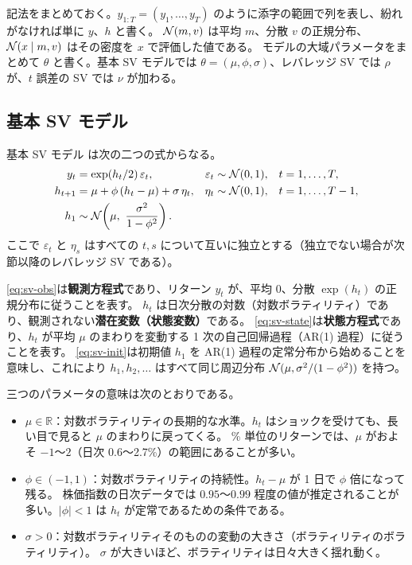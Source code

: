 記法をまとめておく。$y_{1:T} = (y_1, \dots, y_T)$ のように添字の範囲で列を表し、紛れがなければ単に $y$、$h$ と書く。
$\mathcal{N}(m, v)$ は平均 $m$、分散 $v$ の正規分布、$\mathcal{N}(x \mid m, v)$ はその密度を $x$ で評価した値である。
モデルの大域パラメータをまとめて $\theta$ と書く。基本 SV モデルでは $\theta = (\mu, \phi, \sigma)$、レバレッジ SV では $\rho$ が、$t$ 誤差の SV では $\nu$ が加わる。

\subsection{基本 SV モデル}\label{sec:model-basic}

基本 SV モデル \parencite{taylor1986,jacquier1994,kim1998} は次の二つの式からなる。
\begin{align}
  y_t &= \exp(h_t/2)\,\varepsilon_t, & \varepsilon_t &\sim \mathcal{N}(0, 1), & t &= 1, \dots, T, \label{eq:sv-obs}\\
  h_{t+1} &= \mu + \phi\,(h_t - \mu) + \sigma\,\eta_t, & \eta_t &\sim \mathcal{N}(0, 1), & t &= 1, \dots, T-1, \label{eq:sv-state}\\
  h_1 &\sim \mathcal{N}\!\left(\mu,\ \frac{\sigma^2}{1-\phi^2}\right). \label{eq:sv-init}
\end{align}
ここで $\varepsilon_t$ と $\eta_s$ はすべての $t, s$ について互いに独立とする（独立でない場合が次節以降のレバレッジ SV である）。

\cref{eq:sv-obs}は\textbf{観測方程式}であり、リターン $y_t$ が、平均 0、分散 $\exp(h_t)$ の正規分布に従うことを表す。
$h_t$ は日次分散の対数（対数ボラティリティ）であり、観測されない\textbf{潜在変数（状態変数）}である。
\cref{eq:sv-state}は\textbf{状態方程式}であり、$h_t$ が平均 $\mu$ のまわりを変動する 1 次の自己回帰過程（AR(1) 過程）に従うことを表す。
\cref{eq:sv-init}は初期値 $h_1$ を AR(1) 過程の定常分布から始めることを意味し、これにより $h_1, h_2, \dots$ はすべて同じ周辺分布 $\mathcal{N}(\mu, \sigma^2/(1-\phi^2))$ を持つ。

三つのパラメータの意味は次のとおりである。
\begin{itemize}
  \item $\mu \in \mathbb{R}$：対数ボラティリティの長期的な水準。$h_t$ はショックを受けても、長い目で見ると $\mu$ のまわりに戻ってくる。
    \% 単位のリターンでは、$\mu$ がおよそ $-1$〜$2$（日次 0.6〜2.7\%）の範囲にあることが多い。
  \item $\phi \in (-1, 1)$：対数ボラティリティの持続性。$h_t - \mu$ が 1 日で $\phi$ 倍になって残る。
    株価指数の日次データでは $0.95$〜$0.99$ 程度の値が推定されることが多い。$|\phi| < 1$ は $h_t$ が定常であるための条件である。
  \item $\sigma > 0$：対数ボラティリティそのものの変動の大きさ（ボラティリティのボラティリティ）。
    $\sigma$ が大きいほど、ボラティリティは日々大きく揺れ動く。
\end{itemize}

